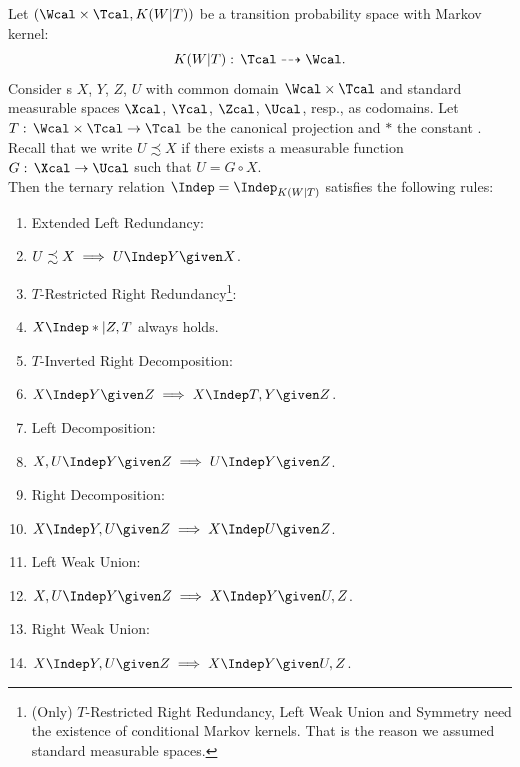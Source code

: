 \begin{DefThm}
    \label{ci-separoid-axioms}
    Let $(\Wcal \times \Tcal, K(W|T))$ be a transition probability space with Markov kernel:
\[K(W|T): \, \Tcal \dashrightarrow  \Wcal.\]
Consider \trv{}s $X$, $Y$, $Z$, $U$ with common domain $\Wcal\times \Tcal$ and standard measurable spaces $\Xcal$, 
$\Ycal$, $\Zcal$, $\Ucal$, resp., as codomains.
Let $T:\, \Wcal \times \Tcal \to \Tcal$ be the canonical projection and $\ast$ the constant \trv{}.\\
Recall that we write $U \precsim X$ if there exists a measurable function %
$G:\, \Xcal \to \Ucal$ 
such that $U = G \circ X$.\\
Then the ternary relation $\Indep = \Indep_{K(W|T)}$ satisfies the following rules:
\begin{enumerate}[label=\alph*)]
	\item Extended Left Redundancy: 
    \item[] $U \precsim X \implies U \Indep  Y \given X$.
    \item $T$-Restricted Right Redundancy\footnote{\label{fn:sep-ax-std}(Only) $T$-Restricted Right Redundancy, Left Weak Union and Symmetry need the existence of conditional Markov kernels. That is the reason we assumed standard measurable spaces.}:
    \item[] $X\Indep \ast|Z,T$ always holds.
    \item $T$-Inverted Right Decomposition: 
    \item[] $X \Indep  Y \given Z \implies X \Indep  T, Y \given Z$.
	\item Left Decomposition:  
	\item[]$X,U \Indep  Y \given Z \implies U \Indep  Y \given Z$.
  \item Right Decomposition:  	
    \item[] $X \Indep  Y,U \given Z \implies X \Indep  U \given Z$.
    \item Left Weak Union:
    \item[] $X , U \Indep  Y  \given Z \implies X \Indep  Y \given U , Z$.
  \item Right Weak Union:\item[] $X \Indep  Y , U \given Z \implies X \Indep  Y \given U , Z$.

\end{enumerate}
\end{DefThm}
